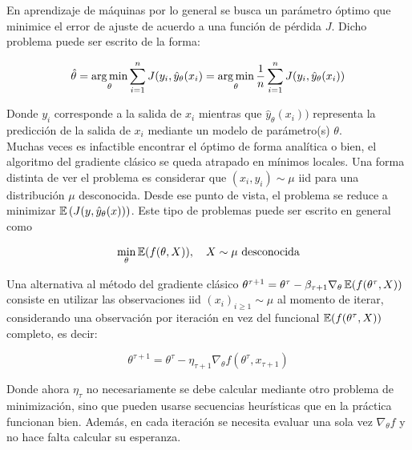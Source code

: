 \begin{mdframed}[style=pendiente, frametitle={\center Método del gradiente estocástico}]

	En aprendizaje de máquinas por lo general se busca un parámetro óptimo que minimice el error de ajuste de acuerdo a una función de pérdida $J$. Dicho problema puede ser escrito de la forma:
	
	\begin{equation}
		\hat{\theta} = \operatorname*{arg\,min}_\theta \sum_{i=1}^n J(y_i,\hat{y}_\theta(x_i) = \operatorname*{arg\,min}_\theta \frac{1}{n} \sum_{i=1}^n J(y_i,\hat{y}_\theta(x_i))
	\end{equation}
	
	Donde $y_i$ corresponde a la salida de $x_i$ mientras que $\hat{y}_\theta(x_i))$ representa la predicción de la salida de $x_i$ mediante un modelo de parámetro(s) $\theta$.\\
	
	Muchas veces es infactible encontrar el óptimo de forma analítica o bien, el algoritmo del gradiente clásico se queda atrapado en mínimos locales. Una forma distinta de ver el problema es considerar que $(x_i,y_i)\sim\mu$ iid para una distribución $\mu$ desconocida. Desde ese punto de vista, el problema se reduce a minimizar $\operatorname{\mathbb{E}}\left(J(y,\hat{y}_\theta(x))\right)$. Este tipo de problemas puede ser escrito en general como
	
	\begin{equation}
		\min_\theta \operatorname{\mathbb{E}}(f(\theta,X)),\quad X\sim \mu\text{ desconocida}
	\end{equation}

Una alternativa al método del gradiente clásico $\theta^{\tau+1} = \theta^\tau - \beta_{\tau+1}\nabla_\theta \operatorname{\mathbb{E}}(f(\theta^\tau,X))$ consiste en utilizar las observaciones iid $(x_i)_{i\geq 1}\sim\mu$ al momento de iterar, considerando una observación por iteración en vez del funcional $\operatorname{\mathbb{E}}(f(\theta^\tau,X))$ completo, es decir:

\begin{equation}
	\theta^{\tau+1} = \theta^\tau - \eta_{\tau+1}\nabla_\theta f(\theta^\tau,x_{\tau+1})
\end{equation}

Donde ahora $\eta_\tau$ no necesariamente se debe calcular mediante otro problema de minimización, sino que pueden usarse secuencias heurísticas que en la práctica funcionan bien. Además, en cada iteración se necesita evaluar una sola vez $\nabla_\theta f$ y no hace falta calcular su esperanza.\\


\end{mdframed}
